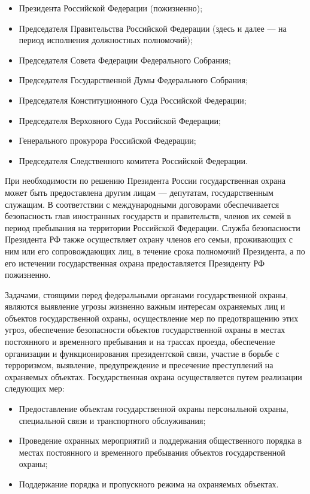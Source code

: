 \documentclass[a4paper,12pt,fleqn]{article} %
\begin{document}
\begin{itemize}
	\item Президента Российской Федерации (пожизненно);
	\item Председателя Правительства Российской Федерации (здесь и далее --- на период исполнения должностных полномочий); 
	\item Председателя Совета Федерации Федерального Собрания; 
	\item Председателя Государственной Думы Федерального Собрания; 
	\item Председателя Конституционного Суда Российской Федерации; 
	\item Председателя Верховного Суда Российской Федерации; 
	\item Генерального прокурора Российской Федерации;
	\item Председателя Следственного комитета Российской Федерации.
\end{itemize}

При необходимости по решению Президента России государственная охрана может быть предоставлена другим лицам --- депутатам, государственным служащим. В соответствии с международными договорами обеспечивается безопасность глав иностранных государств и правительств, членов их семей в период пребывания на территории Российской Федерации.	Служба безопасности Президента РФ также осуществляет охрану членов его семьи, проживающих с ним или его сопровождающих лиц, в течение срока полномочий Президента, а по его истечении государственная охрана предоставляется Президенту РФ  пожизненно.

Задачами, стоящими перед федеральными органами государственной охраны, являются выявление угрозы жизненно важным интересам охраняемых лиц и объектов государственной охраны, осуществление мер по предотвращению этих угроз, обеспечение безопасности объектов государственной охраны в местах постоянного и временного пребывания и на трассах проезда, обеспечение организации и функционирования президентской связи, участие в борьбе с терроризмом, выявление, предупреждение и пресечение преступлений на охраняемых объектах. Государственная охрана осуществляется путем реализации следующих мер:

\begin{itemize}
	\item Предоставление объектам государственной охраны персональной охраны, специальной связи и транспортного обслуживания;
	\item Проведение охранных мероприятий и поддержания общественного порядка в местах постоянного и временного пребывания объектов государственной охраны;
	\item Поддержание порядка и пропускного режима на охраняемых объектах.
\end{itemize}
\end{document}
